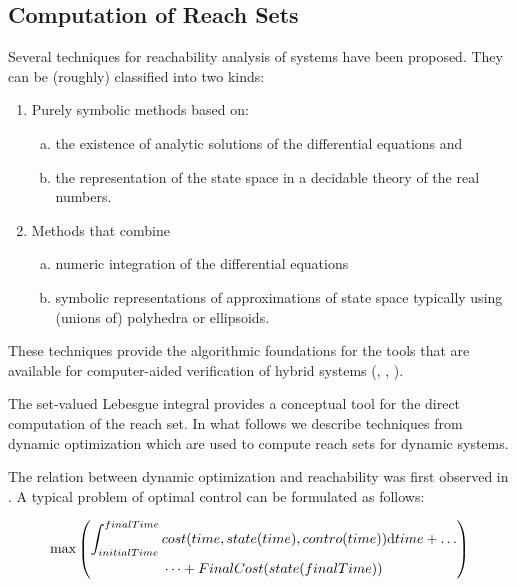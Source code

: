     \subsection{Computation of Reach Sets}
    \noindent   Several techniques for reachability analysis of systems have been proposed. They can be (roughly) classified into two kinds:
    
    \begin{enumerate}
    \item Purely symbolic methods based on: 
        \begin{enumerate}[a.]
        \item the existence of analytic solutions of the differential equations and 
    
        \item the representation of the state space in a decidable theory of the real numbers.
        \end{enumerate}
    \item Methods that combine 
    \begin{enumerate}[a.]
        \item numeric integration of the differential equations
    
        \item symbolic representations of approximations of state space typically using (unions of) polyhedra or ellipsoids.
        \end{enumerate}
    \end{enumerate}
    These techniques provide the algorithmic foundations for the tools that are available for computer-aided verification of hybrid systems (\cite{daws1996tool}, \cite{henzinger1994symbolic}, \cite{henzinger1995hytech}).

    The set-valued Lebesgue integral provides a conceptual tool for the direct computation of the reach set. In what follows we describe techniques from dynamic optimization which are used to compute reach sets for dynamic systems.

    The relation between dynamic optimization and reachability was first observed in \cite{leitmann1982optimality}. A typical problem of optimal control can be formulated as follows:

    \begin{equation}
        \max \left(
        \begin{gathered}
            \int_{initialTime}^{finalTime} cost(time,state(time),contro(time)) \textnormal{d}time + \dots \\ \dots +FinalCost(state(finalTime))\end{gathered}
        \right)
    \end{equation}
    
